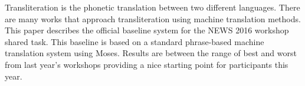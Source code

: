 Transliteration is the phonetic translation between two different languages. There are many works that approach transliteration using machine translation methods. This paper describes the official baseline system for the NEWS 2016 workshop shared task. This baseline is based on a standard phrase-based machine translation system using Moses. Results are between the range of best and worst from last year's workshops providing a nice starting point for participants this year.
